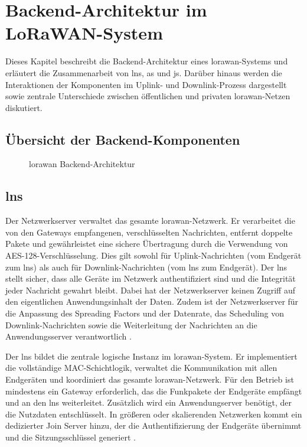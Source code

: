 %
%
\chapter{Backend-Architektur im LoRaWAN-System}
	Dieses Kapitel beschreibt die Backend-Architektur eines \ac{lorawan}-Systems und erläutert die Zusammenarbeit von \acf{lns}, \acf{as} und \acf{js}. Darüber hinaus werden die Interaktionen der Komponenten im Uplink- und Downlink-Prozess dargestellt sowie zentrale Unterschiede zwischen öffentlichen und privaten \acs{lorawan}-Netzen diskutiert.
	
\section{Übersicht der Backend-Komponenten}
	\begin{figure}[H]
		\centering
		\resizebox{\textwidth}{!}{
			\begin{tikzpicture}
				\LoRaWANBAckendinfrastructure
			\end{tikzpicture}
		}
		\caption{\ac{lorawan} Backend-Architektur \cite{Montagny:2022}}
	\end{figure}

\section{\acl{lns} \label{server:lns}}
	Der Netzwerkserver verwaltet das gesamte \ac{lorawan}-Netzwerk. Er verarbeitet die von den Gateways 	empfangenen, verschlüsselten Nachrichten, entfernt doppelte Pakete und gewährleistet eine sichere Übertragung durch die Verwendung von AES-128-Verschlüsselung. Dies gilt sowohl für Uplink-Nachrichten (vom Endgerät zum \ac{lns}) als auch für Downlink-Nachrichten (vom \ac{lns} zum Endgerät). Der \ac{lns} stellt sicher, dass alle Geräte im Netzwerk authentifiziert sind und die Integrität jeder Nachricht gewahrt bleibt. Dabei hat der Netzwerkserver keinen Zugriff auf den eigentlichen Anwendungsinhalt der Daten. Zudem ist der Netzwerkserver für die Anpassung des Spreading Factors und der Datenrate, das Scheduling von Downlink-Nachrichten sowie die Weiterleitung der Nachrichten an die Anwendungsserver verantwortlich \cite{Semtech:2024, Montagny:2022}.

	Der \ac{lns} bildet die zentrale logische Instanz im \ac{lorawan}-System. Er implementiert die vollständige MAC-Schichtlogik, verwaltet die Kommunikation mit allen Endgeräten und koordiniert das gesamte \ac{lorawan}-Netzwerk. Für den Betrieb ist mindestens ein Gateway erforderlich, das die Funkpakete der Endgeräte empfängt und an den \ac{lns} weiterleitet. Zusätzlich wird ein Anwendungserver benötigt, der die Nutzdaten entschlüsselt. In grö{\ss}eren oder skalierenden Netzwerken kommt ein dedizierter Join Server hinzu, der die Authentifizierung der Endgeräte übernimmt und die Sitzungsschlüssel generiert \cite{Semtech:2024, Montagny:2022}.
	
